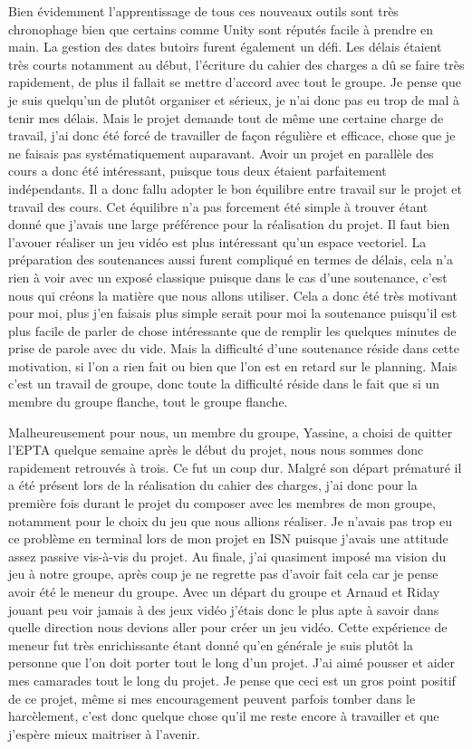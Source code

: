 \documentclass[a4paper, 12pt]{article}
\begin{document}
	\smallbreak
\par Bien évidemment l’apprentissage de tous ces nouveaux outils sont très chronophage bien que certains comme Unity sont réputés facile à prendre en main. La gestion des dates butoirs furent également un défi. Les délais étaient très courts notamment au début, l’écriture du cahier des charges a dû se faire très rapidement, de plus il fallait se mettre d’accord avec tout le groupe. Je pense que je suis quelqu’un de plutôt organiser et sérieux, je n’ai donc pas eu trop de mal à tenir mes délais. Mais le projet demande tout de même une certaine charge de travail, j’ai donc été forcé de travailler de façon régulière et efficace, chose que je ne faisais pas systématiquement auparavant. Avoir un projet en parallèle des cours a donc été intéressant, puisque tous deux étaient parfaitement indépendants. Il a donc fallu adopter le bon équilibre entre travail sur le projet et travail des cours. Cet équilibre n’a pas forcement été simple à trouver étant donné que j’avais une large préférence pour la réalisation du projet. Il faut bien l’avouer réaliser un jeu vidéo est plus intéressant qu’un espace vectoriel. La préparation des soutenances aussi furent compliqué en termes de délais, cela n’a rien à voir avec un exposé classique puisque dans le cas d’une soutenance, c’est nous qui créons la matière que nous allons utiliser. Cela a donc été très motivant pour moi, plus j’en faisais plus simple serait pour moi la soutenance puisqu’il est plus facile de parler de chose intéressante que de remplir les quelques minutes de prise de parole avec du vide. Mais la difficulté d’une soutenance réside dans cette motivation, si l’on a rien fait ou bien que l’on est en retard sur le planning. Mais c’est un travail de groupe, donc toute la difficulté réside dans le fait que si un membre du groupe flanche, tout le groupe flanche.
	\smallbreak
\par Malheureusement pour nous, un membre du groupe, Yassine, a choisi de quitter l’EPTA quelque semaine après le début du projet, nous nous sommes donc rapidement retrouvés à trois. Ce fut un coup dur. Malgré son départ prématuré il a été présent lors de la réalisation du cahier des charges, j’ai donc pour la première fois durant le projet du composer avec les membres de mon groupe, notamment pour le choix du jeu que nous allions réaliser. Je n’avais pas trop eu ce problème en terminal lors de mon projet en ISN puisque j’avais une attitude assez passive vis-à-vis du projet. Au finale, j’ai quasiment imposé ma vision du jeu à notre groupe, après coup je ne regrette pas d’avoir fait cela car je pense avoir été le meneur du groupe. Avec un départ du groupe et Arnaud et Riday jouant peu voir jamais à des jeux vidéo j’étais donc le plus apte à savoir dans quelle direction nous devions aller pour créer un jeu vidéo. Cette expérience de meneur fut très enrichissante étant donné qu’en générale je suis plutôt la personne que l’on doit porter tout le long d’un projet. J’ai aimé pousser et aider mes camarades tout le long du projet. Je pense que ceci est un gros point positif de ce projet, même si mes encouragement peuvent parfois tomber dans le harcèlement, c’est donc quelque chose qu’il me reste encore à travailler et que j’espère mieux maitriser à l’avenir.
\end{document}
